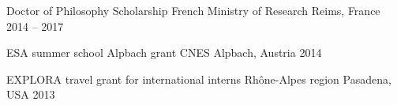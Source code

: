 

\begin{cvhonors}

  \cvhonor
  	{Doctor of Philosophy Scholarship}
  	{French Ministry of Research}
  	{Reims, France}
  	{2014 -- 2017}

  \cvhonor
  	{ESA summer school Alpbach grant}
  	{CNES}
  	{Alpbach, Austria}
  	{2014}

  \cvhonor
  	{EXPLORA travel grant for international interns}
  	{Rhône-Alpes region}
  	{Pasadena, USA}
  	{2013}

\end{cvhonors}
